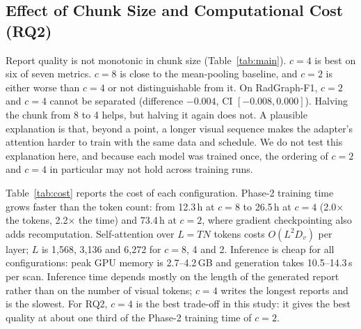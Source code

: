 \documentclass[conference]{IEEEtran}
\begin{document}
\subsection{Effect of Chunk Size and Computational Cost (RQ2)}

Report quality is not monotonic in chunk size (Table~\ref{tab:main}). $c=4$
is best on six of seven metrics. $c=8$ is close to the mean-pooling baseline,
and $c=2$ is either worse than $c=4$ or not distinguishable from it. On
RadGraph-F1, $c=2$ and $c=4$ cannot be separated (difference $-0.004$, CI
$[-0.008, 0.000]$). Halving the chunk from 8 to 4 helps, but halving it again
does not. A plausible explanation is that, beyond a point, a longer visual
sequence makes the adapter's attention harder to train with the same data
and schedule. We do not test this explanation here, and because each model
was trained once, the ordering of $c=2$ and $c=4$ in particular may not hold
across training runs.

Table~\ref{tab:cost} reports the cost of each configuration. Phase-2
training time grows faster than the token count: from 12.3\,h at $c=8$ to
26.5\,h at $c=4$ (2.0$\times$ the tokens, 2.2$\times$ the time) and 73.4\,h
at $c=2$, where gradient checkpointing also adds recomputation. Self-attention
over $L=TN$ tokens costs $O(L^2 D_v)$ per layer; $L$ is 1,568, 3,136 and
6,272 for $c=8$, 4 and 2. Inference is cheap for all configurations: peak GPU
memory is 2.7--4.2\,GB and generation takes 10.5--14.3\,s per scan. Inference
time depends mostly on the length of the generated report rather than on the
number of visual tokens; $c=4$ writes the longest reports and is the slowest.
For RQ2, $c=4$ is the best trade-off in this study: it gives the best quality
at about one third of the Phase-2 training time of $c=2$.
\end{document}
